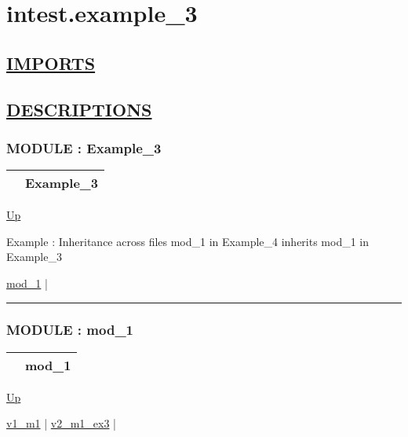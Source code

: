 \chapter*{intest.example\_3}
\hypertarget{ecldoc:toc:intest.example_3}{}

\section*{\underline{IMPORTS}}

\section*{\underline{DESCRIPTIONS}}
\subsection*{MODULE : Example\_3}
\hypertarget{ecldoc:intest.Example_3}{}

{\renewcommand{\arraystretch}{1.5}
\begin{tabularx}{\textwidth}{|>{\raggedright\arraybackslash}l|X|}
\hline
\hspace{0pt} & Example\_3 \\
\hline
\end{tabularx}
}

\hyperlink{ecldoc:toc:intest}{Up}

\par
Example : Inheritance across files mod\_1 in Example\_4 inherits mod\_1 in Example\_3


\hyperlink{ecldoc:intest.Example_3.mod_1}{mod\_1}  |

\rule{\textwidth}{0.4pt}

\subsection*{MODULE : mod\_1}
\hypertarget{ecldoc:intest.Example_3.mod_1}{}

{\renewcommand{\arraystretch}{1.5}
\begin{tabularx}{\textwidth}{|>{\raggedright\arraybackslash}l|X|}
\hline
\hspace{0pt} & mod\_1 \\
\hline
\end{tabularx}
}

\hyperlink{ecldoc:intest.Example_3}{Up}

\par


\hyperlink{ecldoc:intest.example_3.mod_1.v1_m1}{v1\_m1}  |
\hyperlink{ecldoc:intest.example_3.mod_1.v2_m1_ex3}{v2\_m1\_ex3}  |


